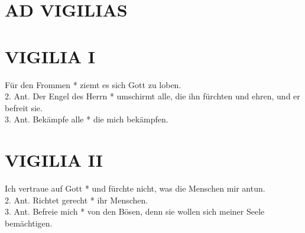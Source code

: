 \thispagestyle{plain}


\section[VIGILIAE]{AD VIGILIAS}


\def\greinitialformat#1{{\fontsize{40}{40}\selectfont #1}}
\setaboveinitialseparation{0.72mm}



\begin{sloppypar}
{}
\end{sloppypar}

\bigskip



\section{VIGILIA I}


\begin{sloppypar}
{  Für den Frommen * ziemt es sich Gott zu loben. \\
2. Ant. Der Engel des Herrn * umschirmt alle, die ihn fürchten und ehren, und  er befreit sie. \\
3. Ant. Bekämpfe alle * die mich bekämpfen. \\}
\end{sloppypar}

\begin{flushleft}


\end{flushleft}

\section{VIGILIA II}

\begin{sloppypar}
{ Ich vertraue auf Gott * und fürchte nicht, was die Menschen mir antun.  \\
2. Ant. Richtet gerecht * ihr Menschen.  \\
3. Ant. Befreie mich * von den Bösen, denn sie wollen sich meiner Seele bemächtigen.  \\}
\end{sloppypar}

